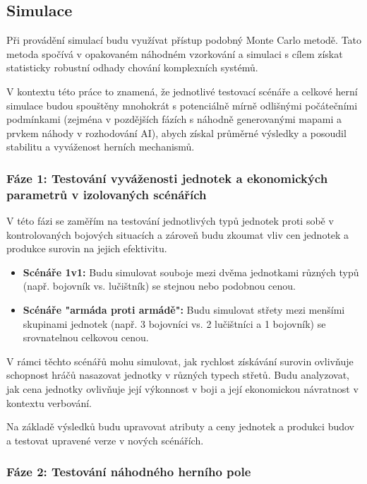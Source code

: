 \subsection{Simulace}

Při provádění simulací budu využívat přístup podobný Monte Carlo metodě. Tato metoda spočívá v opakovaném náhodném vzorkování a simulaci s cílem získat statisticky robustní odhady chování komplexních systémů. 

V kontextu této práce to znamená, že jednotlivé testovací scénáře a celkové herní simulace budou spouštěny mnohokrát s potenciálně mírně odlišnými počátečními podmínkami (zejména v pozdějších fázích s náhodně generovanými mapami a prvkem náhody v rozhodování AI), abych získal průměrné výsledky a posoudil stabilitu a vyváženost herních mechanismů.

\subsubsection{Fáze 1: Testování vyváženosti jednotek a ekonomických parametrů v izolovaných scénářích}

V této fázi se zaměřím na testování jednotlivých typů jednotek proti sobě v kontrolovaných bojových situacích a zároveň budu zkoumat vliv cen jednotek a produkce surovin na jejich efektivitu.

\begin{itemize}
    \item \textbf{Scénáře 1v1:} Budu simulovat souboje mezi dvěma jednotkami různých typů (např. bojovník vs. lučištník) se stejnou nebo podobnou cenou.
    \item \textbf{Scénáře "armáda proti armádě":} Budu simulovat střety mezi menšími skupinami jednotek (např. 3 bojovníci vs. 2 lučištníci a 1 bojovník) se srovnatelnou celkovou cenou.
\end{itemize}

V rámci těchto scénářů mohu simulovat, jak rychlost získávání surovin ovlivňuje schopnost hráčů nasazovat jednotky v různých typech střetů.
Budu analyzovat, jak cena jednotky ovlivňuje její výkonnost v boji a její ekonomickou návratnost v kontextu verbování.

Na základě výsledků budu upravovat atributy a ceny jednotek a produkci budov a testovat upravené verze v nových scénářích.

\subsubsection{Fáze 2: Testování náhodného herního pole}

